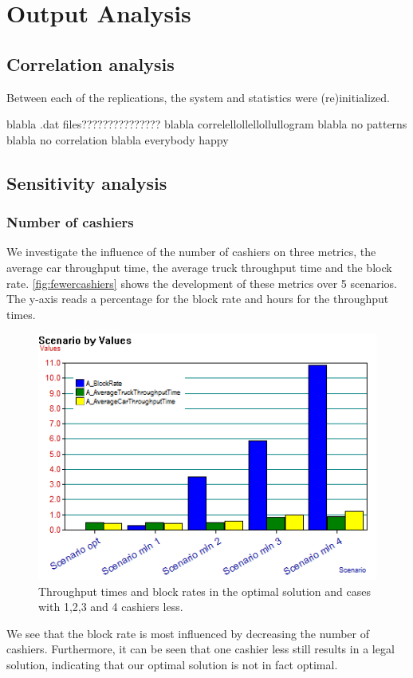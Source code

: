 \section{Output Analysis}
\subsection{Correlation analysis}
Between each of the replications, the system and statistics were (re)initialized.

blabla .dat files??????????????? blabla correlellollellollullogram blabla no patterns blabla no correlation blabla everybody happy


\subsection{Sensitivity analysis}
\subsubsection{Number of cashiers}
We investigate the influence of the number of cashiers on three metrics, the average car throughput time, the average truck throughput time and the block rate.
\autoref{fig:fewercashiers} shows the development of these metrics over 5 scenarios.
The y-axis reads a percentage for the block rate and hours for the throughput times.

\begin{figure}[ht!]
	\centering
	\includegraphics[width=.75\textwidth]{images/fewerCashiers.png}
	\caption{Throughput times and block rates in the optimal solution and cases with 1,2,3 and 4 cashiers less.}
	\label{fig:fewercashiers}
\end{figure}

We see that the block rate is most influenced by decreasing the number of cashiers.
Furthermore, it can be seen that one cashier less still results in a legal solution, indicating that our optimal solution is not in fact optimal.


